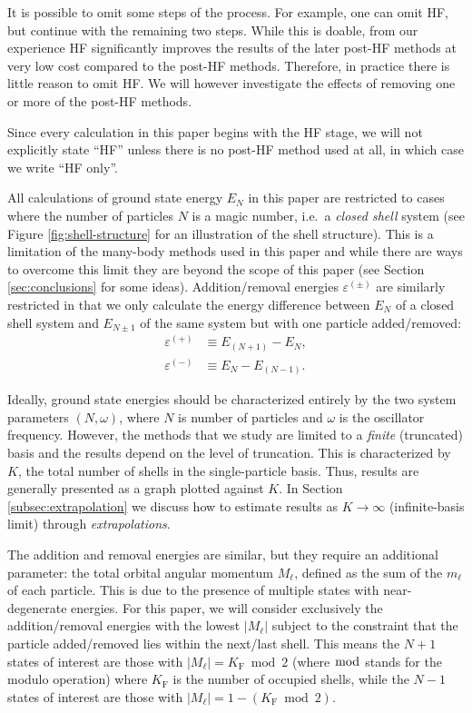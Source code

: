 It is possible to omit some steps of the process.  For example, one can omit HF, but continue with the remaining two steps.  While this is doable, from our experience HF significantly improves the results of the later post-HF methods at very low cost compared to the post-HF methods.  Therefore, in practice there is little reason to omit HF.  We will however investigate the effects of removing one or more of the post-HF methods.

Since every calculation in this paper begins with the HF stage, we will not explicitly state ``HF'' unless there is no post-HF method used at all, in which case we write ``HF only''.

All calculations of ground state energy $E_N$ in this paper are restricted to cases where the number of particles $N$ is a magic number, i.e.\ a \textit{closed shell} system (see Figure \ref{fig:shell-structure} for an illustration of the shell structure).  This is a limitation of the many-body methods used in this paper and while there are ways to overcome this limit they are beyond the scope of this paper (see Section \ref{sec:conclusions} for some ideas).  Addition/removal energies $\varepsilon^{(\pm)}$ are similarly restricted in that we only calculate the energy difference between $E_N$ of a closed shell system and $E_{N \pm 1}$ of the same system but with one particle added/removed:
\begin{align*}
  \varepsilon^{(+)} &\equiv E_{(N + 1)} - E_N, \\
  \varepsilon^{(-)} &\equiv E_N - E_{(N - 1)}.
\end{align*}

Ideally, ground state energies should be characterized entirely by the two system parameters $(N, \omega)$, where $N$ is number of particles and $\omega$ is the oscillator frequency.  However, the methods that we study are limited to a \emph{finite} (truncated) basis and the results depend on the level of truncation.  This is characterized by $K$, the total number of shells in the single-particle basis.  Thus, results are generally presented as a graph plotted against $K$.  In Section \ref{subsec:extrapolation} we discuss how to estimate results as $K \to \infty$ (infinite-basis limit) through \textit{extrapolations}.

The addition and removal energies are similar, but they require an additional parameter: the total orbital angular momentum $M_\ell$, defined as the sum of the $m_\ell$ of each particle.  This is due to the presence of multiple states with near-degenerate energies.  For this paper, we will consider exclusively the addition/removal energies with the lowest $|M_\ell|$ subject to the constraint that the particle added/removed lies within the next/last shell.  This means the $N + 1$ states of interest are those with $|M_\ell| = K_{\mathrm{F}} \bmod 2$ (where $\bmod$ stands for the modulo operation) where $K_{\mathrm{F}}$ is the number of occupied shells, while the $N - 1$ states of interest are those with $|M_\ell| = 1 - (K_{\mathrm{F}} \bmod 2)$.

